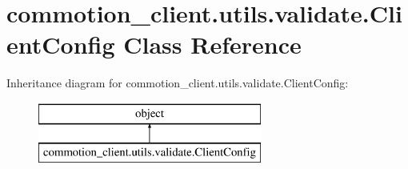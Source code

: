 \hypertarget{classcommotion__client_1_1utils_1_1validate_1_1ClientConfig}{\section{commotion\-\_\-client.\-utils.\-validate.\-Client\-Config Class Reference}
\label{classcommotion__client_1_1utils_1_1validate_1_1ClientConfig}
}
Inheritance diagram for commotion\-\_\-client.\-utils.\-validate.\-Client\-Config\-:\begin{figure}[H]
\begin{center}
\leavevmode
\includegraphics[height=2.000000cm]{classcommotion__client_1_1utils_1_1validate_1_1ClientConfig}
\end{center}
\end{figure}
